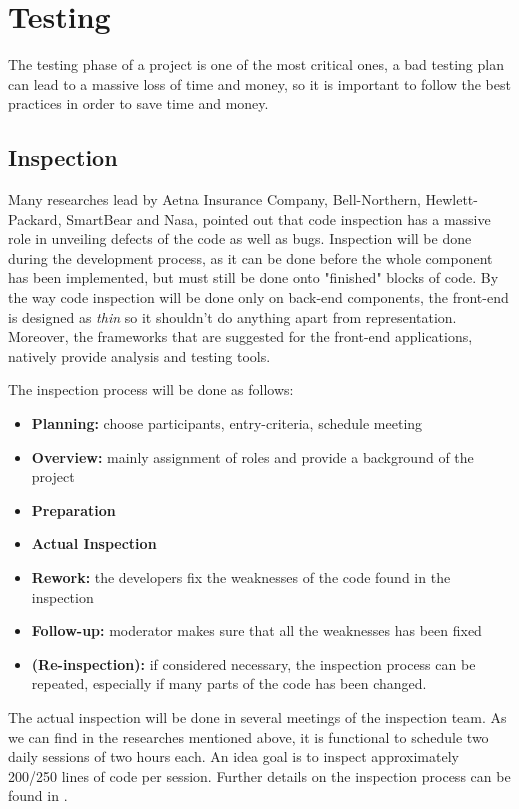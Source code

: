 \section{Testing}
The testing phase of a project is one of the most critical ones, a bad testing
plan can lead to a massive loss of time and money, so it is important to follow
the best practices in order to save time and money.

\subsection{Inspection}
Many researches lead by Aetna Insurance Company, Bell-Northern, Hewlett-Packard,
SmartBear and Nasa, pointed out that code inspection has a massive role in
unveiling defects of the code as well as bugs. Inspection will be done during
the development process, as it can be done before the whole component has been
implemented, but must still be done onto "finished" blocks of code. By
the way code inspection will be done only on back-end components, the front-end
is designed as \emph{thin} so it shouldn't do anything apart from
representation. Moreover, the frameworks that are suggested for the front-end
applications, natively provide analysis and testing tools.

The inspection process will be done as follows:
\begin{itemize}
    \item \textbf{Planning:} choose participants, entry-criteria, schedule
        meeting
    \item \textbf{Overview:} mainly assignment of roles and provide a background
        of the project
    \item \textbf{Preparation}
    \item \textbf{Actual Inspection}
    \item \textbf{Rework:} the developers fix the weaknesses of the code found
        in the inspection
    \item \textbf{Follow-up:} moderator makes sure that all the weaknesses has
        been fixed
    \item \textbf{(Re-inspection):} if considered necessary, the inspection
        process can be repeated, especially if many parts of the code has been
        changed.
\end{itemize}

The actual inspection will be done in several meetings of the inspection team.
As we can find in the researches mentioned above, it is functional to schedule
two daily sessions of two hours each. An idea goal is to inspect approximately
200/250 lines of code per session. Further details on the inspection process can
be found in \cite{smartbear:code-inspection}.

